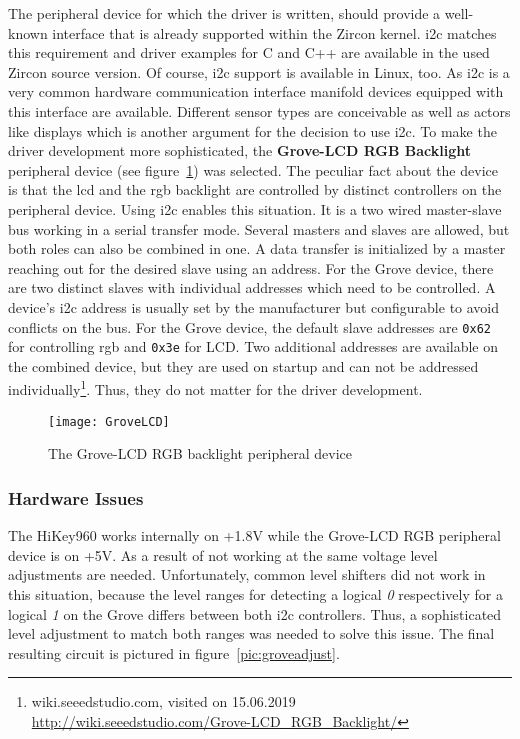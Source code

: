 The peripheral device for which the driver is written, should provide a well-known interface that is already supported within the Zircon kernel.
\ac{i2c} matches this requirement and driver examples for C and C++ are available in the used Zircon source version.
Of course, \ac{i2c} support is available in Linux, too.
As \ac{i2c} is a very common hardware communication interface manifold devices equipped with this interface are available.
Different sensor types are conceivable as well as actors like displays which is another argument for the decision to use \ac{i2c}.
To make the driver development more sophisticated, the \textbf{Grove-LCD RGB Backlight} peripheral device (see figure~\ref{pic:grove}) was selected.
The peculiar fact about the device is that the \ac{lcd} and the \acs{rgb} backlight are controlled by distinct controllers on the peripheral device.
Using \ac{i2c} enables this situation.
It is a two wired master-slave bus working in a serial transfer mode.
Several masters and slaves are allowed, but both roles can also be combined in one.
A data transfer is initialized by a master reaching out for the desired slave using an address.
For the Grove device, there are two distinct slaves with individual addresses which need to be controlled.
A device's \ac{i2c} address is usually set by the manufacturer but configurable to avoid conflicts on the bus.
For the Grove device, the default slave addresses are \texttt{0x62} for controlling \ac{rgb} and \texttt{0x3e} for LCD\@.
Two additional addresses are available on the combined device, but they are used on startup and can not be addressed individually\footnote{wiki.seeedstudio.com, visited on 15.06.2019 \url{http://wiki.seeedstudio.com/Grove-LCD_RGB_Backlight/}}.
Thus, they do not matter for the driver development.

\begin{figure} [t]
    \centering
    \texttt{[image: GroveLCD]}
    \caption{The Grove-LCD RGB backlight peripheral device}\label{pic:grove}
\end{figure} 

\subsubsection*{Hardware Issues}
The HiKey960 works internally on +1.8V  while the Grove-LCD RGB peripheral device is on +5V.
As a result of not working at the same voltage level adjustments are needed.
Unfortunately, common level shifters did not work in this situation, because the level ranges for detecting a logical \textit{0} respectively for a logical \textit{1} on the Grove differs between both \ac{i2c} controllers.
Thus, a sophisticated level adjustment to match both ranges was needed to solve this issue.
The final resulting circuit is pictured in figure~\ref{pic:groveadjust}.

